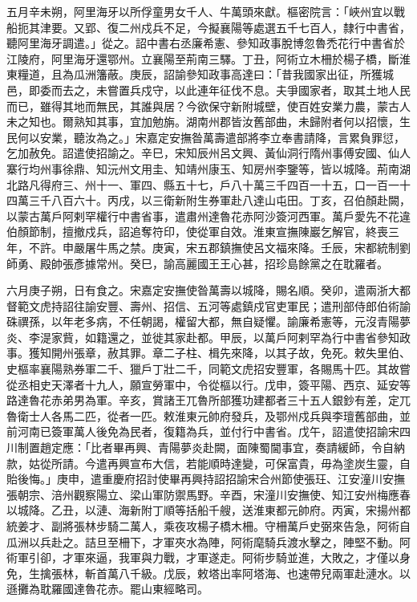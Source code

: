 \begin{pinyinscope}
 五月辛未朔，阿里海牙以所俘童男女千人、牛萬頭來獻。樞密院言：「峽州宜以戰船扼其津要。又郢、復二州戍兵不足，今擬襄陽等處選五千七百人，隸行中書省，聽阿里海牙調遣。」從之。詔中書右丞廉希憲、參知政事脫博忽魯禿花行中書省於江陵府，阿里海牙還鄂州。立襄陽至荊南三驛。丁丑，阿術立木柵於楊子橋，斷淮東糧道，且為瓜洲籓蔽。庚辰，詔諭參知政事高達曰：「昔我國家出征，所獲城邑，即委而去之，未嘗置兵戍守，以此連年征伐不息。夫爭國家者，取其土地人民而已，雖得其地而無民，其誰與居？今欲保守新附城壁，使百姓安業力農，蒙古人未之知也。爾熟知其事，宜加勉旃。湖南州郡皆汝舊部曲，未歸附者何以招懷，生民何以安業，聽汝為之。」宋嘉定安撫昝萬壽遣部將李立奉書請降，言累負罪愆，乞加赦免。詔遣使招諭之。辛巳，宋知辰州呂文興、黃仙洞行隋州事傅安國、仙人寨行均州事徐鼎、知沅州文用圭、知靖州康玉、知房州李鑒等，皆以城降。荊南湖北路凡得府三、州十一、軍四、縣五十七，戶八十萬三千四百一十五，口一百一十四萬三千八百六十。丙戌，以三衛新附生券軍赴八達山屯田。丁亥，召伯顏赴闕，以蒙古萬戶阿剌罕權行中書省事，遣肅州達魯花赤阿沙簽河西軍。萬戶愛先不花違伯顏節制，擅撤戍兵，詔追奪符印，使從軍自效。淮東宣撫陳巖乞解官，終喪三年，不許。申嚴屠牛馬之禁。庚寅，宋五郡鎮撫使呂文福來降。壬辰，宋都統制劉師勇、殿帥張彥據常州。癸巳，諭高麗國王王心甚，招珍島餘黨之在耽羅者。



 六月庚子朔，日有食之。宋嘉定安撫使昝萬壽以城降，賜名順。癸卯，遣兩浙大都督範文虎持詔往諭安豐、壽州、招信、五河等處鎮戍官吏軍民；遣刑部侍郎伯術諭硃禩孫，以年老多病，不任朝謁，權留大都，無自疑懼。諭廉希憲等，元沒青陽夢炎、李湜家貲，如籍還之，並徙其家赴都。甲辰，以萬戶阿剌罕為行中書省參知政事。獲知開州張章，赦其罪。章二子柱、楫先來降，以其子故，免死。敕失里伯、史樞率襄陽熟券軍二千、獵戶丁壯二千，同範文虎招安豐軍，各賜馬十匹。其故嘗從丞相史天澤者十九人，願宣勞軍中，令從樞以行。戊申，簽平陽、西京、延安等路達魯花赤弟男為軍。辛亥，賞諸王兀魯所部獲功建都者三十五人銀鈔有差，定兀魯衛士人各馬二匹，從者一匹。敕淮東元帥府發兵，及鄂州戍兵與李璮舊部曲，並前河南已簽軍萬人後免為民者，復籍為兵，並付行中書省。戊午，詔遣使招諭宋四川制置趙定應：「比者畢再興、青陽夢炎赴闕，面陳蜀閫事宜，奏請緩師，令自納款，姑從所請。今遣再興宣布大信，若能順時達變，可保富貴，毋為塗炭生靈，自貽後悔。」庚申，遣重慶府招討使畢再興持詔招諭宋合州節使張玨、江安潼川安撫張朝宗、涪州觀察陽立、梁山軍防禦馬野。辛酉，宋潼川安撫使、知江安州梅應春以城降。乙丑，以漣、海新附丁順等括船千艘，送淮東都元帥府。丙寅，宋揚州都統姜才、副將張林步騎二萬人，乘夜攻楊子橋木柵。守柵萬戶史弼來告急，阿術自瓜洲以兵赴之。詰旦至柵下，才軍夾水為陣，阿術麾騎兵渡水擊之，陣堅不動。阿術軍引卻，才軍來逼，我軍與力戰，才軍遂走。阿術步騎並進，大敗之，才僅以身免，生擒張林，斬首萬八千級。戊辰，敕塔出率阿塔海、也速帶兒兩軍赴漣水。以遜攤為耽羅國達魯花赤。罷山東經略司。




\end{pinyinscope}
